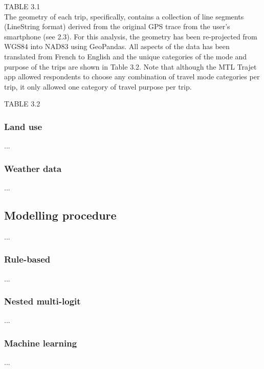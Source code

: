 TABLE 3.1
\\

The geometry of each trip, specifically, contains a collection of line segments (LineString format) derived from the original GPS trace from the user’s smartphone (see 2.3). For this analysis, the geometry has been re-projected from WGS84 into NAD83 using GeoPandas.
All aspects of the data has been translated from French to English and the unique categories of the mode and purpose of the trips are shown in Table 3.2. Note that although the MTL Trajet app allowed respondents to choose any combination of travel mode categories per
trip, it only allowed one category of travel purpose per trip.

TABLE 3.2
\\

\subsubsection{Land use}
...
\subsubsection{Weather data}
...
\subsection{Modelling procedure}
...
\subsubsection{Rule-based}
...
\subsubsection{Nested multi-logit}
...
\subsubsection{Machine learning}
...

